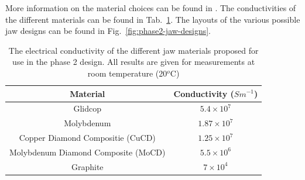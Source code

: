 More information on the material choices can be found in \cite{Bertarelli:Mat, Bertarelli:HiRadMat}. The conductivities of the different materials can be found in Tab.~\ref{tab:phase2-cond}. The layouts of the various possible jaw designs can be found in Fig.~\ref{fig:phase2-jaw-designs}.

\begin{table}
\caption{The electrical conductivity of the different jaw materials proposed for use in the phase 2 design. All results are given for measurements at room temperature (20$^{o}$C)}
\begin{center}
\begin{tabular}{c | c }
Material & Conductivity ($S m^{-1}$) \\ \hline
Glidcop & $5.4 \times 10^{7}$ \\ \hline
Molybdenum & $1.87 \times 10^{7}$ \\ \hline
Copper Diamond Compositie (CuCD) & $1.25 \times 10^{7}$ \\ \hline
Molybdenum Diamond Composite (MoCD) & $5.5 \times 10^{6}$ \\ \hline
Graphite & $7 \times 10^{4}$ \\ \hline
\end{tabular}
\end{center}
\label{tab:phase2-cond}
\end{table}

